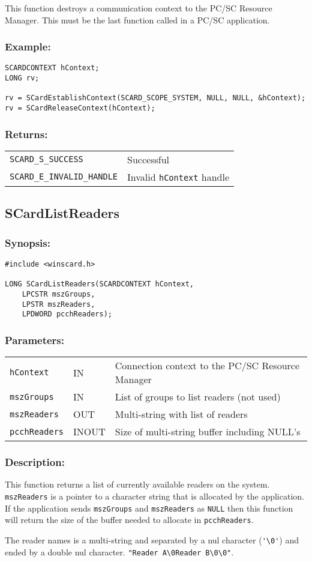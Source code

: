 \documentclass[a4paper,12pt]{article}
\newcommand{\synopsis}{\subsubsection{Synopsis:}}
\newcommand{\parameters}{\subsubsection{Parameters:}}
\newcommand{\desc}{\subsubsection{Description:}}
\newcommand{\example}{\subsubsection{Example:}}
\newcommand{\returns}{\subsubsection{Returns:}}
\begin{document}
This function destroys a communication context to the PC/SC Resource
Manager. This must be the last function called in a PC/SC application.

\example
\begin{verbatim}
SCARDCONTEXT hContext;
LONG rv;

rv = SCardEstablishContext(SCARD_SCOPE_SYSTEM, NULL, NULL, &hContext);
rv = SCardReleaseContext(hContext);
\end{verbatim}

\returns

\begin{tabular}{ll}
\texttt{SCARD\_S\_SUCCESS} & Successful\\
\texttt{SCARD\_E\_INVALID\_HANDLE} & Invalid \texttt{hContext} handle
\end{tabular}


\subsection{SCardListReaders}

\synopsis
\begin{verbatim}
#include <winscard.h>

LONG SCardListReaders(SCARDCONTEXT hContext,
    LPCSTR mszGroups,
    LPSTR mszReaders,
    LPDWORD pcchReaders);
\end{verbatim}

\parameters

\begin{tabular}{lll}
\texttt{hContext} & IN & Connection context to the PC/SC Resource Manager\\
\texttt{mszGroups} & IN & List of groups to list readers (not used)\\
\texttt{mszReaders} & OUT & Multi-string with list of readers\\
\texttt{pcchReaders} & INOUT & Size of multi-string buffer including NULL's
\end{tabular}

\desc

This function returns a list of currently available readers on the
system. \texttt{mszReaders} is a pointer to a character string that is
allocated by the application. If the application sends
\texttt{mszGroups} and \texttt{mszReaders} as \texttt{NULL} then this
function will return the size of the buffer needed to allocate in
\texttt{pcchReaders}.

The reader names is a multi-string and separated by a nul character
(\verb+'\0'+) and ended by a double nul character.
\verb+"Reader A\0Reader B\0\0"+.
\end{document}
